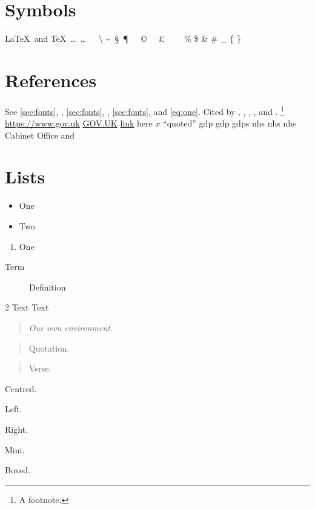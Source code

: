 \documentclass[11pt,a4paper]{report}
\theoremstyle{definition}
\newcommand{\dept}{Cabinet Office\xspace}
\newenvironment{keypoint}{\begin{quote}\itshape}{\end{quote}}
\begin{document}
\section{Symbols}
\LaTeX\ and \TeX\ \ldots\ \dots\ \textendash\ \textemdash\ \textbackslash
\textasciitilde\ \S\ \P\ \dag\ \ddag\ \copyright\ \textregistered
\texttrademark\ \pounds\ \textdegree\ \checkmark\ \textbullet\ \textbar
\% \$ \& \# \_ \{ \} \degree\ \celsius

\section{References}
See \cref{sec:fonts}, , \ref{sec:fonts}, \pageref{sec:fonts},
\autoref{sec:fonts},  and \eqref{eq:one}.
Cited by \cite{smith2020}, \citet{smith2020}, \citep[p.~4]{smith2020},
\citeauthor{smith2020}, \citeyear{smith2020} and \citealp{smith2020}.
\footnote{A footnote.}\footnotemark{}
  
\url{https://www.gov.uk} \href{https://www.gov.uk}{GOV.UK}
\hyperlink{target}{link} \hypertarget{target}{here}
\texorpdfstring{$x$}{x} 
\enquote{quoted} 
\gls{gdp} \Gls{gdp} \glspl{gdp} \acrshort{nhs} \acrlong{nhs} \acrfull{nhs}
\dept and \lipsum[1]

\section{Lists}
\begin{itemize}
  \item One
  \item[--] Two
\end{itemize}
\begin{enumerate}[label=(\alph*)]
  \item One
\end{enumerate}
\begin{description}
  \item[Term] Definition
\end{description}
\begin{multicols}{2}
Text \columnbreak Text
\end{multicols}
\begin{keypoint}Our own environment.\end{keypoint}
\begin{quotation}Quotation.\end{quotation}
\begin{verse}Verse.\end{verse}
\begin{center}Centred.\end{center}
\begin{flushleft}Left.\end{flushleft}
\begin{flushright}Right.\end{flushright}
\begin{minipage}{0.5\textwidth}Mini.\end{minipage}
\begin{tcolorbox}Boxed.\end{tcolorbox}
\end{document}
